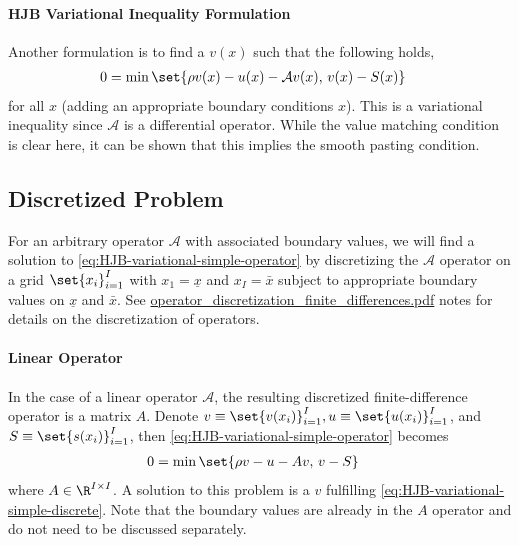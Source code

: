 \documentclass[11pt]{etk-article}
\begin{document}
\paragraph{HJB Variational Inequality Formulation}
Another formulation is to find a $v(x)$ such that the following holds,
\begin{align}
	0 &= \min\set{\rho v(x) - u(x) - \mathcal{A} v(x),\, v(x) - S(x) }\label{eq:HJB-variational-simple-operator}
\end{align}	
for all $x$ (adding an appropriate boundary conditions $x$).  This is a variational inequality since $\mathcal{A}$ is a differential operator.  While the value matching condition is clear here, it can be shown that this implies the smooth pasting condition.


\subsection{Discretized Problem}\label{sec:discretized-stationary}
For an arbitrary operator $\mathcal{A}$ with associated boundary values, we will find a solution to \cref{eq:HJB-variational-simple-operator} by discretizing the $\mathcal{A}$ operator on a grid $\set{x_i}_{i=1}^I$ with $x_1 = \underline{x}$ and $x_I = \bar{x}$ subject to appropriate boundary values on $\underline{x}$ and $\bar{x}$.  See \url{operator_discretization_finite_differences.pdf} notes for details on the discretization of operators.
\paragraph{Linear Operator}
In the case of a linear operator $\mathcal{A}$, the resulting discretized finite-difference operator is a matrix $A$.  Denote $v \equiv \set{v(x_i)}_{i=1}^I, u \equiv \set{u(x_i)}_{i=1}^I$, and $S \equiv \set{s(x_i)}_{i=1}^I$, then \cref{eq:HJB-variational-simple-operator} becomes
\begin{align}
	0 &= \min\set{\rho v - u - A v,\, v - S }\label{eq:HJB-variational-simple-discrete}
\end{align}
where $A\in\R^{I\times I}$.  A solution to this problem is a $v$ fulfilling \cref{eq:HJB-variational-simple-discrete}.  Note that the boundary values are already in the $A$ operator and do not need to be discussed separately.
\end{document}

